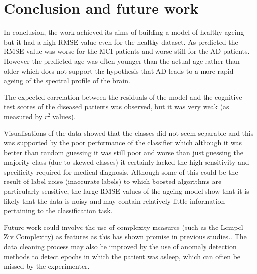 \chapter{Conclusion and future work}

In conclusion, the work achieved its aims of building a model of healthy ageing but it had a high RMSE value even for the healthy dataset. As predicted the RMSE value was worse for the MCI patients and worse still for the AD patients. However the predicted age was often younger than the actual age rather than older which does not support the hypothesis that AD leads to a more rapid ageing of the spectral profile of the brain. 

The expected correlation between the residuals of the model and the cognitive test scores of the diseased patients was observed, but it was very weak (as measured by $r^2$ values).

Visualisations of the data showed that the classes did not seem separable and this was supported by the poor performance of the classifier which although it was better than random guessing it was still poor and worse than just guessing the majority class (due to skewed classes) it certainly lacked the high sensitivity and specificity required for medical diagnosis. Although some of this could be the result of label noise (inaccurate labels) to which boosted algorithms are particularly sensitive, the large RMSE values of the ageing model show that it is likely that the data is noisy and may contain relatively little information pertaining to the classification task.

Future work could involve the use of complexity measures (such as the Lempel-Ziv Complexity) as features as this has shown promise in previous studies.\cite{Hornero2008}\cite{Fernandez2012}. The data cleaning process may also be improved by the use of anomaly detection methods\cite{Chandola2009} to detect epochs in which the patient was asleep, which can often be missed by the experimenter.  